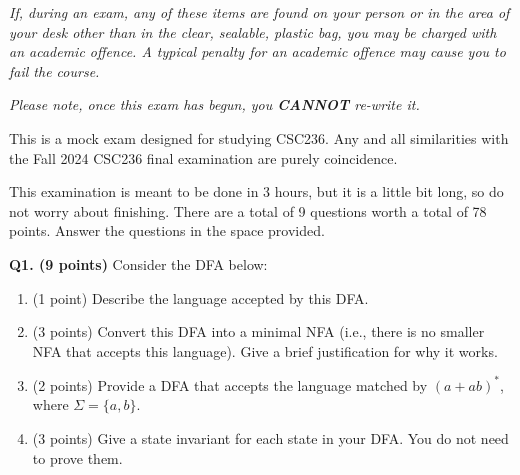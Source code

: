 \documentclass{article}
\begin{document}
\begin{center}
{{            \medskip

            \textit{\large If, during an exam, any of these items are found on your person or in the area of your desk other than in the clear, sealable, plastic bag, you may be charged with an academic offence. A typical penalty for an academic offence may cause you to fail the course.}

            \medskip

            \textit{\large Please note, once this exam has begun, you \textbf{CANNOT} re-write it.}
        }}
    \end{center}

    \noindent This is a mock exam designed for studying CSC236. Any and all similarities with the Fall 2024 CSC236 final examination are purely coincidence.

    \noindent This examination is meant to be done in 3 hours, but it is a little bit long, so do not worry about finishing. There are a total of 9 questions worth a total of 78 points. Answer the questions in the space provided.

    \pagebreak

    \noindent\textbf{Q1. (9 points)} Consider the DFA below:
    \begin{center}
    \end{center}
    \begin{enumerate}[label=\alph*)]
        \item (1 point) Describe the language accepted by this DFA.

        \item (3 points) Convert this DFA into a minimal NFA (i.e., there is no smaller NFA that accepts this language). Give a brief justification for why it works.
        
        \pagebreak

        \item  (2 points) Provide a DFA that accepts the language matched by \((a+ab)^*\), where \(\Sigma = \{a, b\}\).
        \vfill
        \item (3 points) Give a state invariant for each state in your DFA. You do not need to prove them.
        \vfill
    \end{enumerate}
\end{document}
